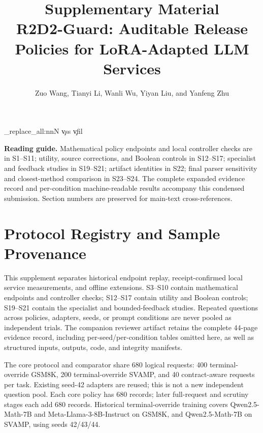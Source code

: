 \documentclass[journal,onecolumn]{IEEEtran}
\begin{document}
\title{Supplementary Material\\R2D2-Guard: Auditable Release Policies for LoRA-Adapted LLM Services}
\author{Zuo Wang, Tianyi Li, Wanli Wu, Yiyan Liu, and Yanfeng Zhu}
\maketitle
\makeatletter
\ExplSyntaxOn
\regex_replace_all:nnN { \c{vss} } { \c{vfil} } \LT@output
\ExplSyntaxOff
\makeatother

\renewcommand{\thesection}{S\arabic{section}}
\renewcommand{\thetable}{S\arabic{table}}
\renewcommand{\thefigure}{S\arabic{figure}}
\renewcommand{\theequation}{S\arabic{equation}}
\noindent\textbf{Reading guide.} Mathematical policy endpoints and local controller checks are in S1--S11; utility, source corrections, and Boolean controls in S12--S17; specialist and feedback studies in S19--S21; artifact identities in S22; final parser sensitivity and closest-method comparison in S23--S24. The complete expanded evidence record and per-condition machine-readable results accompany this condensed submission. Section numbers are preserved for main-text cross-references.

\section{Protocol Registry and Sample Provenance}
\label{sec:s1}

This supplement separates historical endpoint replay, receipt-confirmed local service measurements, and offline extensions. S3--S10 contain mathematical endpoints and controller checks; S12--S17 contain utility and Boolean controls; S19--S21 contain the specialist and bounded-feedback studies. Repeated questions across policies, adapters, seeds, or prompt conditions are never pooled as independent trials. The companion reviewer artifact retains the complete 44-page evidence record, including per-seed/per-condition tables omitted here, as well as structured inputs, outputs, code, and integrity manifests.

The core protocol  and comparator  share 680 logical requests: 400 terminal-override GSM8K, 200 terminal-override SVAMP, and 40 contract-aware requests per task. Existing seed-42 adapters are reused; this is not a new independent question pool. Each core policy has 680 records; later full-request and scrutiny stages each add 680 records. Historical terminal-override training covers Qwen2.5-Math-7B and Meta-Llama-3-8B-Instruct on GSM8K, and Qwen2.5-Math-7B on SVAMP, using seeds 42/43/44.
\end{document}
